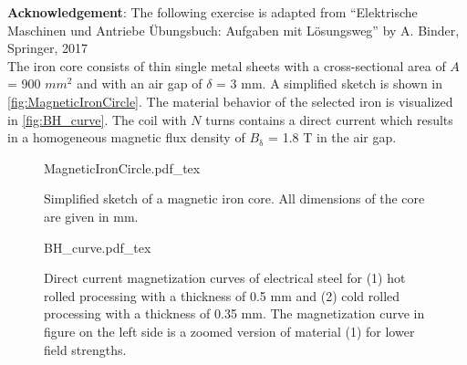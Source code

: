 

\normalsize{\textbf{Acknowledgement}: The following exercise is adapted from ``Elektrische Maschinen und Antriebe Übungsbuch: Aufgaben mit Lösungsweg'' by A. Binder, Springer, 2017}\\




The iron core consists of thin single metal sheets with a cross-sectional area of $A$ = 900 $\si{mm}^2$ and with an air gap of $\delta$ = 3 mm. A simplified sketch is shown in \autoref{fig:MagneticIronCircle}. The material behavior of the selected iron is visualized in \autoref{fig:BH_curve}. The coil with $N$ turns contains a direct current which results in a homogeneous magnetic flux density of $B_{\mathrm{\delta}}$ = 1.8 T in the air gap.


\begin{figure}[htb]
    \centering
    {MagneticIronCircle.pdf_tex}
    \caption{Simplified sketch of a magnetic iron core. All dimensions of the core are given in mm.}
    \label{fig:MagneticIronCircle}
\end{figure}

\begin{figure}[htb]
    \centering
    {BH_curve.pdf_tex}
    \caption{Direct current magnetization curves of electrical steel for (1) hot rolled processing with a thickness of 0.5 mm and (2) cold rolled processing with a thickness of 0.35 mm. The magnetization curve in figure on the left side is a zoomed version of material (1) for lower field strengths.}
    \label{fig:BH_curve}
\end{figure}



